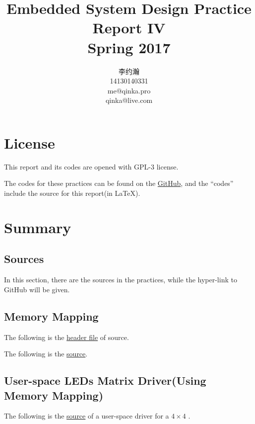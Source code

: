 \documentclass{report}
\title{Embedded System Design Practice Report IV \\ Spring 2017}
\author{李约瀚 \\ 14130140331 \\ me@qinka.pro \\ qinka@live.com}
\begin{document}
    \maketitle
    \tableofcontents
    
    \chapter{License}
    \label{chap:license}
    This report and its codes are opened with GPL-3 license.
    
    The codes for these practices can be found on the%
    \href{https://github.com/Qinka/embedded-system-design-homework}{GitHub},
    and the ``codes'' include the source for this report(in \LaTeX).
    
    \chapter{Summary}
    \label{chap:summary}
    
    
    \begin{appendix}
        \chapter{Sources}
        \label{achap:source}

        In this section, there are the sources in the practices, while the hyper-link to GitHub will be given.

        \section{Memory Mapping}
        \label{src:memmap}
        
        The following is the
        \href{https://github.com/Qinka/embedded-system-design-homework/blob/master/practice4/led.h}{header file} 
        of source.
        

        The following is the  \href{https://github.com/Qinka/embedded-system-design-homework/blob/master/practice4/led.c}{source}.
        

         \section{User-space LEDs Matrix Driver(Using Memory Mapping)}
        \label{src:uslmd}
        
        The following is the \href{https://github.com/Qinka/embedded-system-design-homework/blob/master/led_mm_daemon/daemon.c}{source} of a user-space driver for a $4 \times 4$ .
        


    \end{appendix}
    
\end{document}
